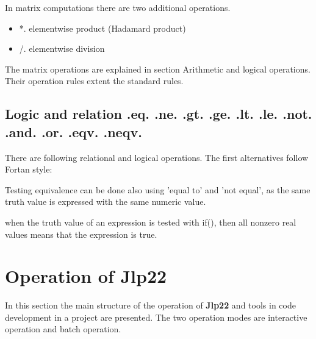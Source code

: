 {In matrix computations there are two additional operations. 
 
 
\begin{itemize} 
\item *. elementwise product (Hadamard product) 
\item /. elementwise division 
\end{itemize} 
 
 
The matrix operations are explained in section Arithmetic and logical operations. Their operation rules extent 
the standard rules. 
\subsection{Logic and relation .eq. .ne. .gt. .ge. .lt. .le. .not. .and. .or. .eqv. .neqv.} 
\label{logic} 
There are following relational and logical operations. The first alternatives 
follow Fortan style: 
 
 
\begin{note} 
Testing equivalence can be done also using 'equal to' and 'not equal', as the same truth 
value is expressed with the same numeric value. 
\end{note} 
\begin{note} 
when the truth value of an expression is tested with \textcolor{VioletRed}{if}(), then all nonzero real values 
means that the expression is true. 
\end{note} 
 
 
\section{Operation of \textbf{Jlp22}} 
\label{joperation} 
In this section the main structure of the operation of \textbf{Jlp22} and tools 
in code development in a project are presented. 
The two operation modes are interactive operation and batch operation. 
}
